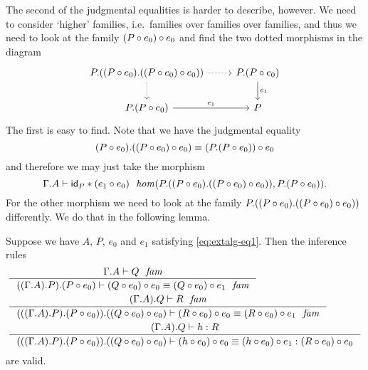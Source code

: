 The second of the judgmental equalities is harder to describe, however. We need
to consider `higher' families, i.e.~families over families over families, and
thus we need to look at the family $\jcomp{}{e_0}{\jcomp{}{e_0}{P}}$ and find the
two dotted morphisms in the diagram
\begin{equation*}
\begin{tikzcd}
\ctxext{P}{{\jcomp{}{e_0}{P}}{\jcomp{}{e_0}{\jcomp{}{e_0}{P}}}}
  \ar[densely dotted]{d}
  \ar[densely dotted]{r}
& \ctxext{P}{\jcomp{}{e_0}{P}} \ar{d}{e_1}\\
\ctxext{P}{\jcomp{}{e_0}{P}} \ar{r}{e_1} & P
\end{tikzcd}
\end{equation*}
The first is easy to find. Note that we have the judgmental equality
\begin{equation*}
\ctxext{\jcomp{}{e_0}{P}}{\jcomp{}{e_0}{\jcomp{}{e_0}{P}}}
  \jdeq
  \jcomp{}{e_0}{\ctxext{P}{\jcomp{}{e_0}{P}}}
\end{equation*}
and therefore we may just take the morphism
\begin{equation*}
\jhom
  {{\Gamma}{A}}
  {{P}{{\jcomp{}{e_0}{P}}{\jcomp{}{e_0}{\jcomp{}{e_0}{P}}}}}
  {{P}{\jcomp{}{e_0}{P}}}
  {\jvcomp{}{\idtm{P}}{\jcomp{}{e_0}{e_1}}}.
\end{equation*}
For the other morphism we need to look at the family
$\ctxext{P}{{\jcomp{}{e_0}{P}}{\jcomp{}{e_0}{\jcomp{}{e_0}{P}}}}$ differently. We do
that in the following lemma.

\begin{lem}\label{lem:extalg-twins}
Suppose we have $A$, $P$, $e_0$ and $e_1$ satisfying \autoref{eq:extalg-eq1}. Then
the inference rules
\begin{align*}
& \inference
  { \jfam{{\Gamma}{A}}{Q}
    }
  { \jfameq
      {{{{\Gamma}{A}}{P}}{\jcomp{}{e_0}{P}}}
      {\jcomp{}{e_0}{\jcomp{}{e_0}{Q}}}
      {\jcomp{}{e_1}{\jcomp{}{e_0}{Q}}}
    }
  \\
& \inference
  { \jfam{{{\Gamma}{A}}{Q}}{R}
    }
  { \jfameq
      {{{{{\Gamma}{A}}{P}}{\jcomp{}{e_0}{P}}}
        {\jcomp{}{e_0}{\jcomp{}{e_0}{Q}}}}
      {\jcomp{}{e_0}{\jcomp{}{e_0}{R}}}
      {\jcomp{}{e_1}{\jcomp{}{e_0}{R}}}
    }
  \\
& \inference
  { \jterm{{{\Gamma}{A}}{Q}}{R}{h}
    }
  { \jtermeq
      {{{{{\Gamma}{A}}{P}}{\jcomp{}{e_0}{P}}}
        {\jcomp{}{e_0}{\jcomp{}{e_0}{Q}}}}
      {\jcomp{}{e_0}{\jcomp{}{e_0}{R}}}
      {\jcomp{}{e_0}{\jcomp{}{e_0}{h}}}
      {\jcomp{}{e_1}{\jcomp{}{e_0}{h}}}
    }
\end{align*}
are valid.
\end{lem}

